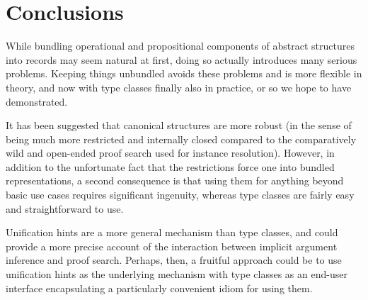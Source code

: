 \documentclass[a4paper,10pt,runningheads]{llncs}
\begin{document}
\section{Conclusions}

While bundling operational and propositional components of abstract structures into records may seem natural at first, doing so actually introduces many serious problems. Keeping things unbundled avoids these problems and is more flexible in theory, and now with type classes finally also in practice, or so we hope to have demonstrated.


It has been suggested that canonical structures are more robust (in the sense of being much more restricted and internally closed compared to the comparatively wild and open-ended proof search used for instance resolution). However, in addition to the unfortunate fact that the restrictions force one into bundled representations, a second consequence is that using them for anything beyond basic use cases requires significant ingenuity, whereas type classes are fairly easy and straightforward to use.


Unification hints are a more general mechanism than type classes, and could provide a more precise account of the interaction between implicit argument inference and proof search. Perhaps, then, a fruitful approach could be to use unification hints as the underlying mechanism with type classes as an end-user interface encapsulating a particularly convenient idiom for using them.
\end{document}
